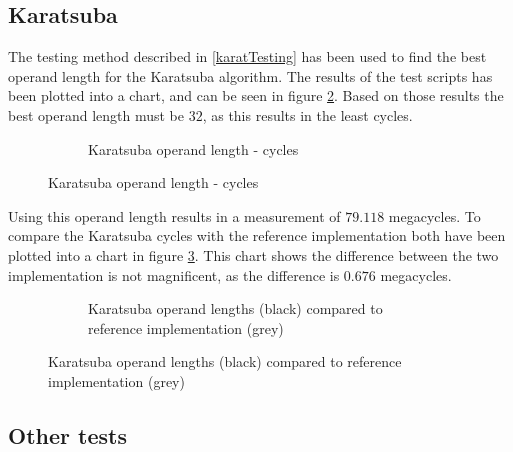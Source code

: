 \subsection{Karatsuba}
The testing method described in \ref{karatTesting} has been used to find the best operand length for the Karatsuba algorithm. The results of the test scripts has been plotted into a chart, and can be seen in figure \ref{karatsubafigure}. Based on those results the best operand length must be $32$, as this results in the least cycles. \\ 
\begin{figure}[H]
\begin{subfigure}{\textwidth}
    \centering
    \caption{Karatsuba operand length - cycles}
\label{karatsubafigure}
\end{subfigure}
\end{figure}
Using this operand length results in a measurement of $79.118$ megacycles. To compare the Karatsuba cycles with the reference implementation both have been plotted into a chart in figure \ref{karatsubacomparison}. This chart shows the difference between the two implementation is not magnificent, as the difference is $0.676$ megacycles.\\

\begin{figure}[H]
\begin{subfigure}{\textwidth}
    \centering
    \caption{Karatsuba operand lengths (black) compared to reference implementation (grey)}
\end{subfigure}
\label{karatsubacomparison}
\end{figure}

\subsection{Other tests}
